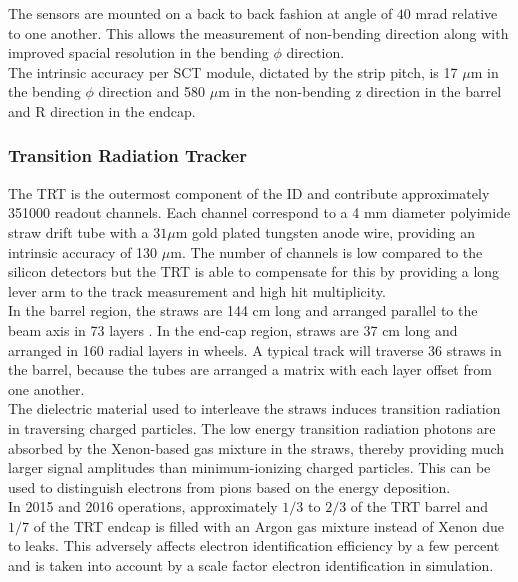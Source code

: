 \indent The sensors are mounted on a back to back fashion at angle of $40$ mrad relative to one another.  This allows the measurement of non-bending direction along with improved spacial resolution in the bending $\phi$ direction.  \\

\indent   The intrinsic accuracy per SCT module, dictated by the strip pitch, is 17 $\mu$m in the bending $\phi$ direction and 580 $\mu$m in the non-bending z direction in the barrel and R direction in the endcap.\\

\subsubsection*{Transition Radiation Tracker}

\indent The TRT is the outermost component of the ID and contribute approximately 351000 readout channels.  Each channel correspond to a 4 mm diameter polyimide straw drift tube with a $31 \mu$m gold plated tungsten anode wire, providing an intrinsic accuracy of 130 $\mu$m.  The number of channels is low compared to the silicon detectors but the TRT is able to compensate for this by providing a long lever arm to the track measurement and high hit multiplicity.  \\

\indent In the barrel region, the straws are 144 cm long and arranged parallel to the beam axis in 73 layers . In the end-cap region, straws are 37 cm long and arranged in 160 radial layers in wheels.  A typical track will traverse 36 straws in the barrel, because the tubes are arranged a matrix with each layer offset from one another.\\

\indent The dielectric material used to interleave the straws induces transition radiation in traversing charged particles.  The low energy transition radiation photons are absorbed by the Xenon-based gas mixture in the straws, thereby providing much larger signal amplitudes than minimum-ionizing charged particles.  This can be used to distinguish electrons from pions based on the energy deposition.  \\

\indent In 2015 and 2016 operations, approximately $1/3$ to $2/3$ of the TRT barrel and $1/7$ of the TRT endcap is filled with an Argon gas mixture instead of Xenon due to leaks.  This adversely affects electron identification efficiency by a few percent and is taken into account by a scale factor electron identification in simulation.  \\

